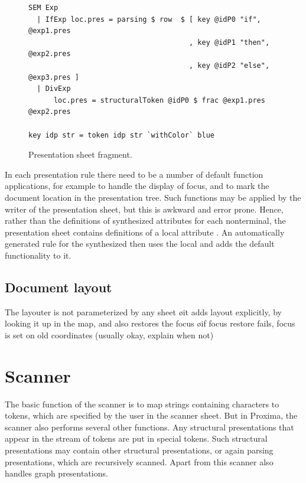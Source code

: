 \documentclass[12pt]{article}
\begin{document}
\begin{figure}
\begin{center}
\begin{footnotesize}
\begin{verbatim}
SEM Exp
  | IfExp loc.pres = parsing $ row  $ [ key @idP0 "if",   @exp1.pres
                                      , key @idP1 "then", @exp2.pres
                                      , key @idP2 "else", @exp3.pres ]
  | DivExp
      loc.pres = structuralToken @idP0 $ frac @exp1.pres @exp2.pres
                  
key idp str = token idp str `withColor` blue 
\end{verbatim}%
\end{footnotesize}
\caption{Presentation sheet fragment.} \label{fig:presentationSheet} 
\end{center}
\end{figure}


In each presentation rule there need to be a number of default function applications, for example to handle the display of focus, and to mark the document location in the presentation tree. Such functions may be applied by the writer of the presentation sheet, but this is awkward and error prone. Hence, rather than the definitions of synthesized attributes  for each nonterminal, the presentation sheet contains definitions of a local attribute . An automatically generated rule for the synthesized  then uses the local  and adds the default functionality to it.

\subsection{Document layout}

The layouter is not parameterized by any sheet
\bl
\o it adds layout explicitly, by looking it up in the map, and also restores the focus
\o if focus restore fails, focus is set on old coordinates (usually okay, explain when not)
\el


%
\section{Scanner}
%

The basic function of the scanner is to map strings containing characters to tokens, which are specified by the user in the scanner sheet. But in Proxima, the scanner also performs several other functions. Any structural presentations that appear in the stream of tokens are put in special tokens. Such structural presentations may contain other structural presentations, or again parsing presentations, which are recursively scanned. Apart from this scanner also handles graph presentations. 
\end{document}
